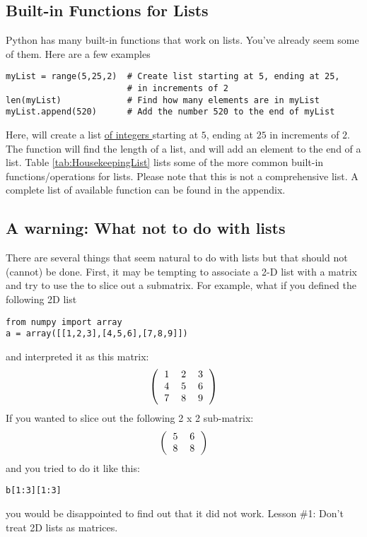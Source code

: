 \subsection*{Built-in Functions for Lists}
Python has many built-in functions that work on lists.  You've already
seem some of them.  Here are a few examples
\begin{Verbatim}
myList = range(5,25,2)  # Create list starting at 5, ending at 25,
                        # in increments of 2
len(myList)             # Find how many elements are in myList
myList.append(520)      # Add the number 520 to the end of myList
\end{Verbatim}
 Here,  will create a list \underline{of integers }
starting at $5$, ending at $25$ in increments of $2$.  The
 function will find the length of a list, and
 will add an element to the end of a list.  Table
\ref{tab:HousekeepingList} lists some of the more common built-in
functions/operations for lists.  Please note that this is not a
comprehensive list.  A complete list of available function can be
found in the appendix.


\subsection*{A warning: What not to do with lists}
There are several things that seem natural to do with lists but that
should not (cannot) be done.  First, it may be tempting to associate a
2-D list with a matrix and try to use the \code{:} to slice out a
submatrix.  For example, what if you defined the following 2D list
\begin{Verbatim}
from numpy import array
a = array([[1,2,3],[4,5,6],[7,8,9]])
\end{Verbatim}
and interpreted it as this matrix:
\begin{equation}
\left( \begin{tabular}{ccc}
1 & 2 & 3\\
4 & 5 & 6\\
7 & 8 & 9\\
\end{tabular}
\right)
\end{equation}
If you wanted to slice out the following 2 x 2 sub-matrix:
\begin{equation}
\left(\begin{tabular}{cc}
5 & 6 \\
8 & 8 \\
\end{tabular}
\right)
\end{equation}
and you tried to do it like this:
\begin{Verbatim}
b[1:3][1:3]
\end{Verbatim}
you would be disappointed to find out that it did not work.  Lesson
\#1: Don't treat 2D lists as matrices.

